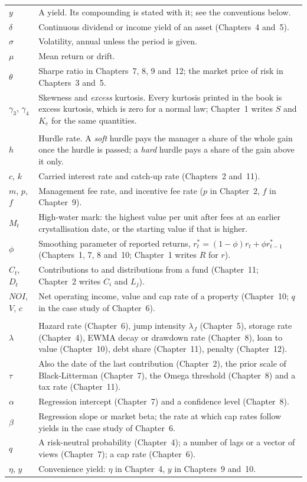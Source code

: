 \begin{longtable}{@{}>{\raggedright\arraybackslash}p{}>{\raggedright\arraybackslash}p{}@{}}
$y$ & A yield. Its compounding is stated with it; see the conventions below.\\
$\delta$ & Continuous dividend or income yield of an asset (Chapters~4 and~5).\\
$\sigma$ & Volatility, annual unless the period is given.\\
$\mu$ & Mean return or drift.\\
$\theta$ & Sharpe ratio in Chapters~7, 8, 9 and~12; the market price of risk in Chapters~3 and~5.\\
$\gamma_3$, $\gamma_4$ & Skewness and \emph{excess} kurtosis. Every kurtosis printed in the book is excess
kurtosis, which is zero for a normal law; Chapter~1 writes $S$ and $K_e$ for the same quantities.\\[3pt]
\multicolumn{2}{@{}l}{\textbf{Funds, fees and smoothing}}\\
$h$ & Hurdle rate. A \emph{soft} hurdle pays the manager a share of the whole gain once the hurdle is
passed; a \emph{hard} hurdle pays a share of the gain above it only.\\
$c$, $k$ & Carried interest rate and catch-up rate (Chapters~2 and~11).\\
$m$, $p$, $f$ & Management fee rate, and incentive fee rate ($p$ in Chapter~2, $f$ in Chapter~9).\\
$M_t$ & High-water mark: the highest value per unit after fees at an earlier crystallisation date, or
the starting value if that is higher.\\
$\phi$ & Smoothing parameter of reported returns, $r^*_t=(1-\phi)r_t+\phi r^*_{t-1}$ (Chapters~1, 7, 8
and~10; Chapter~1 writes $R$ for $r$).\\
$C_t$, $D_t$ & Contributions to and distributions from a fund (Chapter~11; Chapter~2 writes $C_i$ and $L_j$).\\
$\mathit{NOI}$, $V$, $c$ & Net operating income, value and cap rate of a property (Chapter~10; $q$ in the
case study of Chapter~6).\\[3pt]
\multicolumn{2}{@{}l}{\textbf{Letters with local meanings}}\\
$\lambda$ & Hazard rate (Chapter~6), jump intensity $\lambda_J$ (Chapter~5), storage rate (Chapter~4),
EWMA decay or drawdown rate (Chapter~8), loan to value (Chapter~10), debt share (Chapter~11),
penalty (Chapter~12).\\
$\tau$ & Also the date of the last contribution (Chapter~2), the prior scale of Black-Litterman
(Chapter~7), the Omega threshold (Chapter~8) and a tax rate (Chapter~11).\\
$\alpha$ & Regression intercept (Chapter~7) and a confidence level (Chapter~8).\\
$\beta$ & Regression slope or market beta; the rate at which cap rates follow yields in the case study of
Chapter~6.\\
$q$ & A risk-neutral probability (Chapter~4); a number of lags or a vector of views (Chapter~7);
a cap rate (Chapter~6).\\
$\eta$, $y$ & Convenience yield: $\eta$ in Chapter~4, $y$ in Chapters~9 and~10.\\
\end{longtable}
